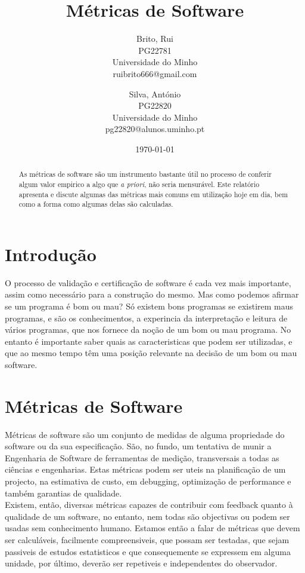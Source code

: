 \documentclass[a4paper,10pt,openright,openbib,twocolumn]{article}
\begin{document}
\title{Métricas de Software}
\date{\today}
\begin{multicols}{2}
\author{
    Brito, Rui\\
    PG22781\\
    Universidade do Minho\\
    ruibrito666@gmail.com
  \and
    Silva, António\\
    PG22820\\
    Universidade do Minho\\
    pg22820@alunos.uminho.pt
}
\date{}
\maketitle
\end{multicols}

\begin{abstract}
As métricas de software são um instrumento bastante útil no processo de conferir algum valor empirico a algo que \emph{a priori}, não seria mensurável. Este relatório apresenta e discute algumas das métricas mais comuns em utilização hoje em dia, bem como a forma como algumas delas são calculadas. 
\end{abstract}

\section{Introdução} 
O processo de validação e certificação de software é cada vez mais importante, assim como necessário para a construção do mesmo.
Mas como podemos afirmar se um programa  é bom ou mau? Só existem bons programas se existirem maus programas, e são os conhecimentos, a experincia da interpretação e leitura de vários programas, que nos fornece da noção de um bom ou mau programa.
No entanto  é importante saber quais as caracteristicas que podem ser utilizadas, e que ao mesmo tempo têm uma posição relevante na decisão de um bom ou mau software.
\section{Métricas de Software}
\label{sec:swmetrics}
Métricas de software são um conjunto de medidas de alguma propriedade do software ou da sua especificação. São, no fundo, um tentativa de munir a Engenharia de Software de ferramentas de medição, transversais a todas as ciências e engenharias. Estas métricas podem ser uteis na planificação de um projecto, na estimativa de custo, em debugging, optimização de performance e também garantias de qualidade.\\
Existem, então, diversas métricas capazes de contribuir com feedback quanto à qualidade de um software, no entanto, nem todas são objectivas ou podem ser usadas sem conhecimento humano. Estamos então a falar de métricas que devem ser calculáveis, facilmente compreensiveis, que possam ser testadas, que sejam passiveis de estudos estatisticos e que consequemente se expressem em alguma unidade, por último, deverão ser repetiveis e independentes do observador.
\end{document}
